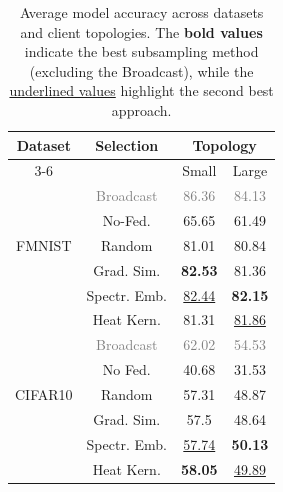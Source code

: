 \documentclass[journal]{IEEEtran}
\begin{document}
\begin{table}[]
\centering
\begin{tabular}{|c|c|clcl|}
\hline
\multirow{2}{*}{Dataset} & \multirow{2}{*}{Selection} & \multicolumn{4}{c|}{Topology}                                            \\ \cline{3-6} 
                         &                            & \multicolumn{2}{c|}{Small}         & \multicolumn{2}{c|}{Large}          \\ \hline
\multirow{5}{*}{FMNIST}  & \textcolor{gray}{Broadcast}                  & \multicolumn{2}{c}{\textcolor{gray}{86.36}} & \multicolumn{2}{c|}{\textcolor{gray}{84.13}} \\ 
                        
                         & No-Fed.                    & \multicolumn{2}{c}{65.65}          & \multicolumn{2}{c|}{61.49}          \\
                         & Random                     & \multicolumn{2}{c}{81.01}          & \multicolumn{2}{c|}{80.84}          \\
                         & Grad. Sim.                    & \multicolumn{2}{c}{\textbf{82.53}}          & \multicolumn{2}{c|}{81.36}          \\
    
                         & Spectr. Emb.               & \multicolumn{2}{c}{ \underline{82.44}}    & \multicolumn{2}{c|}{\textbf{82.15}}    \\
                         & Heat Kern.                 & \multicolumn{2}{c}{81.31}          & \multicolumn{2}{c|}{\underline{81.86}}          \\ \hline
\multirow{5}{*}{CIFAR10} & \textcolor{gray}{Broadcast}                  & \multicolumn{2}{c}{\textcolor{gray}{62.02}} & \multicolumn{2}{c|}{\textcolor{gray}{54.53}} \\
        
                         & No Fed.                    & \multicolumn{2}{c}{40.68}          & \multicolumn{2}{c|}{31.53}          \\
                         & Random                     & \multicolumn{2}{c}{57.31}          & \multicolumn{2}{c|}{48.87}          \\
                         & Grad. Sim.                    & \multicolumn{2}{c}{57.5}          & \multicolumn{2}{c|}{48.64}          \\
    
                          & Spectr. Emb.               & \multicolumn{2}{c}{\underline{57.74}}          & \multicolumn{2}{c|}{\textbf{50.13}}  \\
                         & Heat Kern.                 & \multicolumn{2}{c}{\textbf{58.05}}    & \multicolumn{2}{c|}{\underline{49.89}}          \\ \hline
\end{tabular}
\caption{Average model accuracy across datasets and client topologies. The \textbf{bold values} indicate the best subsampling method  (excluding the
Broadcast), while the \underline{underlined values} highlight the second best approach.} %
\label{tab:res_table}
\end{table}
\end{document}
